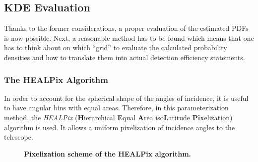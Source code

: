 \subsection{KDE Evaluation}

Thanks to the former considerations, a proper evaluation of the estimated PDFs is now possible. Next, a reasonable method has to be found which means that one has to think about on which \enquote{grid} to evaluate the calculated probability densities and how to translate them into actual detection efficiency statements.

\subsubsection{The HEALPix Algorithm}

In order to account for the spherical shape of the angles of incidence, it is useful to have angular bins with equal areas. Therefore, in this parameterization method, the \textit{HEALPix} (\textbf{H}ierarchical \textbf{E}qual \textbf{A}rea iso\textbf{L}atitude \textbf{Pix}elization) algorithm is used. It allows a uniform pixelization of incidence angles to the telescope.\\

\begin{figure}[h]
	\centering
	\begin{subfigure}[t]{0.48\textwidth}
		\centering
		\label{}
	\end{subfigure}
	\hfill
	\begin{subfigure}[t]{0.48\textwidth}
		\centering
		\usebox{\savedimage}
		\label{}
	\end{subfigure}
	\caption[Pixelization scheme of the HEALPix algorithm]{\textbf{Pixelization scheme of the HEALPix algorithm.} \cite[adapted]{healpix:paper}}
	\label{healpix:pixelization}
\end{figure}

